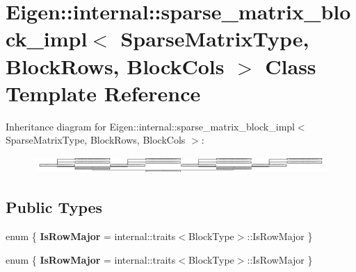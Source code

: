 \hypertarget{class_eigen_1_1internal_1_1sparse__matrix__block__impl}{}\section{Eigen\+:\+:internal\+:\+:sparse\+\_\+matrix\+\_\+block\+\_\+impl$<$ Sparse\+Matrix\+Type, Block\+Rows, Block\+Cols $>$ Class Template Reference}
\label{class_eigen_1_1internal_1_1sparse__matrix__block__impl}
Inheritance diagram for Eigen\+:\+:internal\+:\+:sparse\+\_\+matrix\+\_\+block\+\_\+impl$<$ Sparse\+Matrix\+Type, Block\+Rows, Block\+Cols $>$\+:\begin{figure}[H]
\begin{center}
\leavevmode
\includegraphics[height=0.643382cm]{class_eigen_1_1internal_1_1sparse__matrix__block__impl}
\end{center}
\end{figure}
\subsection*{Public Types}
\begin{DoxyCompactItemize}
\item 
\mbox{\label{class_eigen_1_1internal_1_1sparse__matrix__block__impl_adf6d548728608ec922342df50c5508ee}} 
enum \{ {\bfseries Is\+Row\+Major} = internal\+:\+:traits$<$Block\+Type$>$\+:\+:Is\+Row\+Major
 \}
\item 
\mbox{\label{class_eigen_1_1internal_1_1sparse__matrix__block__impl_a83b090db18c90a77cbc4848a2e17a489}} 
enum \{ {\bfseries Is\+Row\+Major} = internal\+:\+:traits$<$Block\+Type$>$\+:\+:Is\+Row\+Major
 \}
\end{DoxyCompactItemize}
